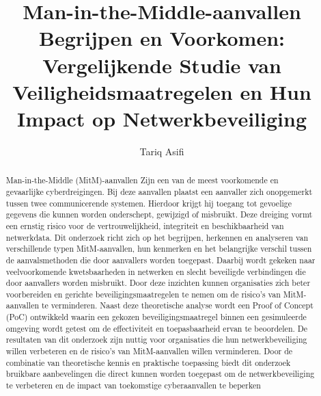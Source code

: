 \documentclass{hogent-article}
\title{Man-in-the-Middle-aanvallen Begrijpen en Voorkomen: Vergelijkende Studie van Veiligheidsmaatregelen en Hun Impact op Netwerkbeveiliging}
\author{Tariq Asifi}
\begin{document}
\begin{abstract}
Man-in-the-Middle (MitM)-aanvallen Zijn een van de meest voorkomende en gevaarlijke cyberdreigingen. Bij deze aanvallen plaatst een aanvaller zich onopgemerkt tussen twee communicerende systemen. Hierdoor krijgt hij toegang tot gevoelige gegevens die kunnen worden onderschept, gewijzigd of misbruikt. Deze dreiging vormt een ernstig risico voor de vertrouwelijkheid, integriteit en beschikbaarheid van netwerkdata. Dit onderzoek richt zich op het begrijpen, herkennen en analyseren van verschillende typen MitM-aanvallen, hun kenmerken en het belangrijke verschil tussen de aanvalsmethoden die door aanvallers worden toegepast. Daarbij wordt gekeken naar veelvoorkomende kwetsbaarheden in netwerken en slecht beveiligde verbindingen die door aanvallers worden misbruikt. Door deze inzichten kunnen organisaties zich beter voorbereiden en gerichte beveiligingsmaatregelen te nemen om de risico’s van MitM-aanvallen te verminderen. Naast deze theoretische analyse wordt een Proof of Concept (PoC) ontwikkeld waarin een gekozen beveiligingsmaatregel binnen een gesimuleerde omgeving wordt getest om de effectiviteit en toepasbaarheid ervan te beoordelen. De resultaten van dit onderzoek zijn nuttig voor organisaties die hun netwerkbeveiliging willen verbeteren en de risico’s van MitM-aanvallen willen verminderen. Door de combinatie van theoretische kennis en praktische toepassing biedt dit onderzoek bruikbare aanbevelingen die direct kunnen worden toegepast om de netwerkbeveiliging te verbeteren en de impact van toekomstige cyberaanvallen te beperken
\end{abstract}

\tableofcontents



\printbibliography[heading=bibintoc]
\end{document}
